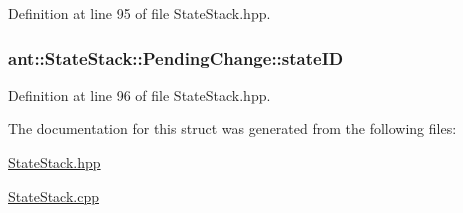 Definition at line 95 of file State\+Stack.\+hpp.

\hypertarget{structant_1_1_state_stack_1_1_pending_change_ac09fea53d60ca1232aaa3e0f670aae2f}{
\subsubsection[{state\+I\+D}]{ ant\+::\+State\+Stack\+::\+Pending\+Change\+::state\+I\+D}}\label{structant_1_1_state_stack_1_1_pending_change_ac09fea53d60ca1232aaa3e0f670aae2f}


Definition at line 96 of file State\+Stack.\+hpp.



The documentation for this struct was generated from the following files\+:\begin{DoxyCompactItemize}
\item 
\hyperlink{_state_stack_8hpp}{State\+Stack.\+hpp}\item 
\hyperlink{_state_stack_8cpp}{State\+Stack.\+cpp}\end{DoxyCompactItemize}

